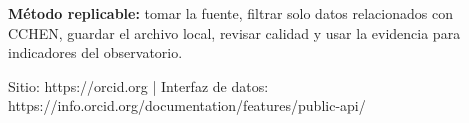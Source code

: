 \documentclass[9pt,a4paper]{extarticle}
\begin{document}
\vspace{0.06cm}
\begin{tcolorbox}[enhanced,colback=white,colframe=cchenpurple!55,boxrule=0.45pt,arc=2pt,left=6pt,right=6pt,top=5pt,bottom=5pt]
{\bfseries\color{cchenpurple}Método replicable:} tomar la fuente, filtrar solo datos relacionados con CCHEN, guardar el archivo local, revisar calidad y usar la evidencia para indicadores del observatorio.
\end{tcolorbox}

\vspace{0.02cm}
{\scriptsize\color{mutedgray}Sitio: https://orcid.org \quad | \quad Interfaz de datos: https://info.orcid.org/documentation/features/public-api/}
\end{document}
